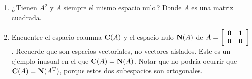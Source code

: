 \documentclass[12pt,a4paper]{article}
\newcommand{\bi}[1]{\hbox{\boldmath$#1$}}
\newcommand\1{\mbox{\,\vrule height-0.8pt depth1.0pt width2pc\,}}
\newcommand\2{\mbox{\,\vrule height-0.8pt depth1.0pt width1pc\,}}
\DeclareRobustCommand\transp{^{\mathrm{T}}}
\begin{document}
\begin{enumerate}
Segundo, si $A\transp A\bi{x}=\bi{0}$, entonces $\bi{x}\transp A\transp A\bi{x}=||A\bi{x}||^2=0$. Deduzca $\hbox{\textbf{N}}(A\transp A)=\,\hbox{\textbf{N}}(A)$.\index[smbl]{$\hbox{\textbf{N}}(A\transp A)=\,\hbox{\textbf{N}}(A)$}\linebreak\vspace{-11pt}
\item ¿\,Tienen $A^2$ y $A$ siempre el mismo espacio nulo\,? Donde  $A$ es una matriz cuadrada.
\item Encuentre el espacio columna $\hbox{\textbf{C}}(A)$ y el espacio nulo $\hbox{\textbf{N}}(A)$ de  $A=\left[\begin{array}{cc}\bi{0}&\bi{1}\\\bi{0}&\bi{0}\\\end{array}\right]$. Recuerde que son espacios vectoriales, no vectores aislados. Este es un ejemplo inusual en el que $\hbox{\textbf{C}}(A)=\textbf{N}(A)$. Notar que no podría ocurrir que $\hbox{\textbf{C}}(A)=\hbox{\textbf{N}}(A\transp)$, porque estos dos subespacios son ortogonales.
%


\end{enumerate}
\end{document}
